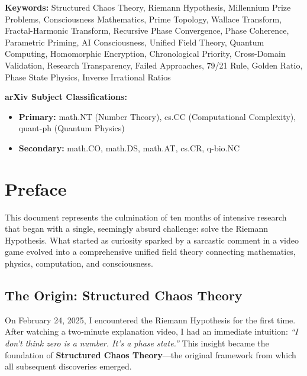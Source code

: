 \documentclass[11pt,a4paper]{report}
\theoremstyle{definition}
\begin{document}
\noindent\textbf{Keywords:} Structured Chaos Theory, Riemann Hypothesis, Millennium Prize Problems, Consciousness Mathematics, Prime Topology, Wallace Transform, Fractal-Harmonic Transform, Recursive Phase Convergence, Phase Coherence, Parametric Priming, AI Consciousness, Unified Field Theory, Quantum Computing, Homomorphic Encryption, Chronological Priority, Cross-Domain Validation, Research Transparency, Failed Approaches, 79/21 Rule, Golden Ratio, Phase State Physics, Inverse Irrational Ratios

\vspace{1cm}
\noindent\textbf{arXiv Subject Classifications:}
\begin{itemize}[noitemsep]
    \item \textbf{Primary:} math.NT (Number Theory), cs.CC (Computational Complexity), quant-ph (Quantum Physics)
    \item \textbf{Secondary:} math.CO, math.DS, math.AT, cs.CR, q-bio.NC
\end{itemize}

\chapter*{Preface}

This document represents the culmination of ten months of intensive research that began with a single, seemingly absurd challenge: solve the Riemann Hypothesis. What started as curiosity sparked by a sarcastic comment in a video game evolved into a comprehensive unified field theory connecting mathematics, physics, computation, and consciousness.

\section*{The Origin: Structured Chaos Theory}

On February 24, 2025, I encountered the Riemann Hypothesis for the first time. After watching a two-minute explanation video, I had an immediate intuition: \textit{``I don't think zero is a number. It's a phase state.''} This insight became the foundation of \textbf{Structured Chaos Theory}---the original framework from which all subsequent discoveries emerged.
\end{document}
